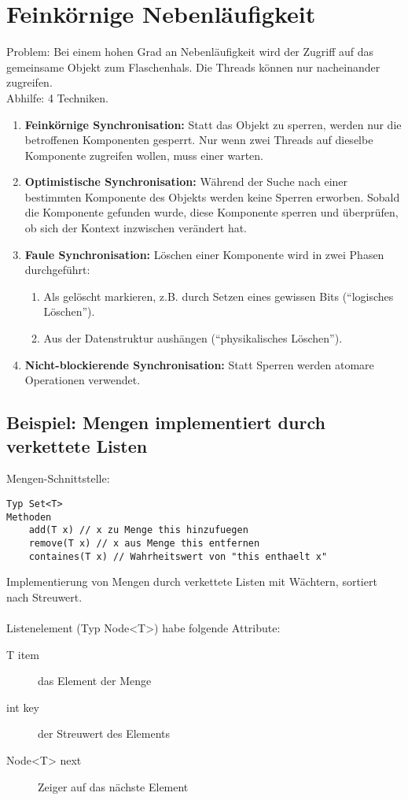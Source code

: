 \chapter{Feinkörnige Nebenläufigkeit}
Problem: Bei einem hohen Grad an Nebenläufigkeit wird der Zugriff auf das gemeinsame Objekt zum Flaschenhals. Die Threads können nur nacheinander zugreifen.\\
Abhilfe: 4 Techniken.
\begin{enumerate}
	\item \textbf{Feinkörnige Synchronisation:} Statt das Objekt zu sperren, werden nur die betroffenen Komponenten gesperrt. Nur wenn zwei Threads auf dieselbe Komponente zugreifen wollen, muss einer warten.
	\item \textbf{Optimistische Synchronisation:} Während der Suche nach einer bestimmten Komponente des Objekts werden keine Sperren erworben. Sobald die Komponente gefunden wurde, diese Komponente sperren und überprüfen, ob sich der Kontext inzwischen verändert hat.
	\item \textbf{Faule Synchronisation:} Löschen einer Komponente wird in zwei Phasen durchgeführt:
	\begin{enumerate}
		\item Als gelöscht markieren, z.B. durch Setzen eines gewissen Bits ("`logisches Löschen"').
		\item Aus der Datenstruktur aushängen ("`physikalisches Löschen"').
	\end{enumerate}
	\item \textbf{Nicht-blockierende Synchronisation:} Statt Sperren werden atomare Operationen verwendet.
\end{enumerate}

\section[Mengen mit verketteten Listen]{Beispiel: Mengen implementiert durch verkettete Listen}
Mengen-Schnittstelle:
\begin{lstlisting}
Typ Set<T>
Methoden
    add(T x) // x zu Menge this hinzufuegen
    remove(T x) // x aus Menge this entfernen
    containes(T x) // Wahrheitswert von "this enthaelt x"
\end{lstlisting}
Implementierung von Mengen durch verkettete Listen mit Wächtern, sortiert nach Streuwert.\\
\\
Listenelement (Typ Node<T>) habe folgende Attribute:\\
\begin{description}
	\item[T item] das Element der Menge
	\item[int key] der Streuwert des Elements
	\item[Node<T> next] Zeiger auf das nächste Element
\end{description}

